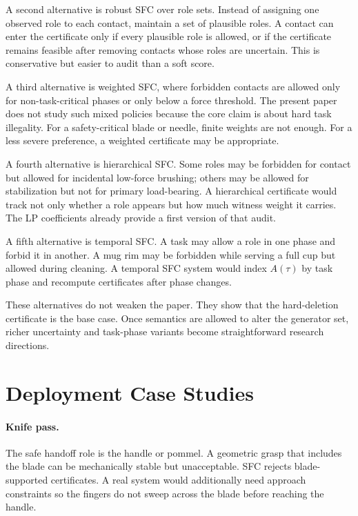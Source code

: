 \documentclass{article}
\begin{document}
A second alternative is robust SFC over role sets. Instead of assigning one observed role to each contact, maintain a set of plausible roles. A contact can enter the certificate only if every plausible role is allowed, or if the certificate remains feasible after removing contacts whose roles are uncertain. This is conservative but easier to audit than a soft score.

A third alternative is weighted SFC, where forbidden contacts are allowed only for non-task-critical phases or only below a force threshold. The present paper does not study such mixed policies because the core claim is about hard task illegality. For a safety-critical blade or needle, finite weights are not enough. For a less severe preference, a weighted certificate may be appropriate.

A fourth alternative is hierarchical SFC. Some roles may be forbidden for contact but allowed for incidental low-force brushing; others may be allowed for stabilization but not for primary load-bearing. A hierarchical certificate would track not only whether a role appears but how much witness weight it carries. The LP coefficients already provide a first version of that audit.

A fifth alternative is temporal SFC. A task may allow a role in one phase and forbid it in another. A mug rim may be forbidden while serving a full cup but allowed during cleaning. A temporal SFC system would index \(A(\tau)\) by task phase and recompute certificates after phase changes.

These alternatives do not weaken the paper. They show that the hard-deletion certificate is the base case. Once semantics are allowed to alter the generator set, richer uncertainty and task-phase variants become straightforward research directions.

\section{Deployment Case Studies}

\paragraph{Knife pass.}
The safe handoff role is the handle or pommel. A geometric grasp that includes the blade can be mechanically stable but unacceptable. SFC rejects blade-supported certificates. A real system would additionally need approach constraints so the fingers do not sweep across the blade before reaching the handle.
\end{document}
